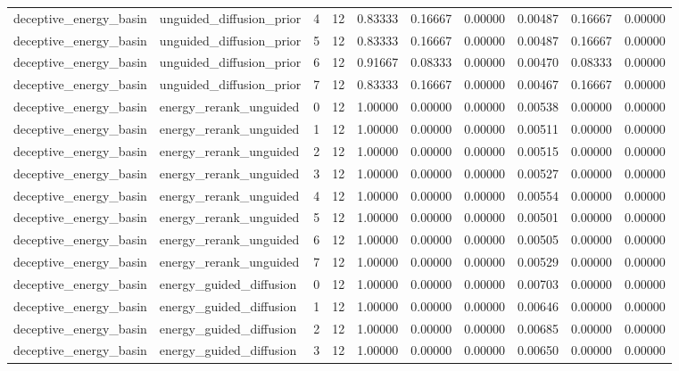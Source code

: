 \documentclass{article}
\begin{document}
\begin{table}[tbp]
{\begin{tabular}{llllllllll}
deceptive\_energy\_basin & unguided\_diffusion\_prior & 4 & 12 & 0.83333 & 0.16667 & 0.00000 & 0.00487 & 0.16667 & 0.00000 \\
deceptive\_energy\_basin & unguided\_diffusion\_prior & 5 & 12 & 0.83333 & 0.16667 & 0.00000 & 0.00487 & 0.16667 & 0.00000 \\
deceptive\_energy\_basin & unguided\_diffusion\_prior & 6 & 12 & 0.91667 & 0.08333 & 0.00000 & 0.00470 & 0.08333 & 0.00000 \\
deceptive\_energy\_basin & unguided\_diffusion\_prior & 7 & 12 & 0.83333 & 0.16667 & 0.00000 & 0.00467 & 0.16667 & 0.00000 \\
deceptive\_energy\_basin & energy\_rerank\_unguided & 0 & 12 & 1.00000 & 0.00000 & 0.00000 & 0.00538 & 0.00000 & 0.00000 \\
deceptive\_energy\_basin & energy\_rerank\_unguided & 1 & 12 & 1.00000 & 0.00000 & 0.00000 & 0.00511 & 0.00000 & 0.00000 \\
deceptive\_energy\_basin & energy\_rerank\_unguided & 2 & 12 & 1.00000 & 0.00000 & 0.00000 & 0.00515 & 0.00000 & 0.00000 \\
deceptive\_energy\_basin & energy\_rerank\_unguided & 3 & 12 & 1.00000 & 0.00000 & 0.00000 & 0.00527 & 0.00000 & 0.00000 \\
deceptive\_energy\_basin & energy\_rerank\_unguided & 4 & 12 & 1.00000 & 0.00000 & 0.00000 & 0.00554 & 0.00000 & 0.00000 \\
deceptive\_energy\_basin & energy\_rerank\_unguided & 5 & 12 & 1.00000 & 0.00000 & 0.00000 & 0.00501 & 0.00000 & 0.00000 \\
deceptive\_energy\_basin & energy\_rerank\_unguided & 6 & 12 & 1.00000 & 0.00000 & 0.00000 & 0.00505 & 0.00000 & 0.00000 \\
deceptive\_energy\_basin & energy\_rerank\_unguided & 7 & 12 & 1.00000 & 0.00000 & 0.00000 & 0.00529 & 0.00000 & 0.00000 \\
deceptive\_energy\_basin & energy\_guided\_diffusion & 0 & 12 & 1.00000 & 0.00000 & 0.00000 & 0.00703 & 0.00000 & 0.00000 \\
deceptive\_energy\_basin & energy\_guided\_diffusion & 1 & 12 & 1.00000 & 0.00000 & 0.00000 & 0.00646 & 0.00000 & 0.00000 \\
deceptive\_energy\_basin & energy\_guided\_diffusion & 2 & 12 & 1.00000 & 0.00000 & 0.00000 & 0.00685 & 0.00000 & 0.00000 \\
deceptive\_energy\_basin & energy\_guided\_diffusion & 3 & 12 & 1.00000 & 0.00000 & 0.00000 & 0.00650 & 0.00000 & 0.00000 \\

\end{tabular}}
\end{table}
\end{document}
